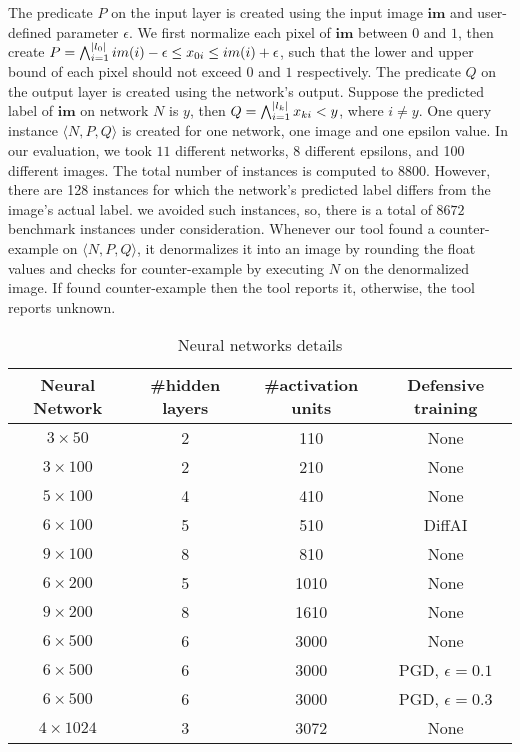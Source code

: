 The predicate $P$ on the input layer is created using the input image $\boldsymbol{im}$ and user-defined parameter $\epsilon$. 
We first normalize each pixel of $\boldsymbol{im}$ between $0$ and $1$, then create 
$P = \bigwedge_{i=1}^{|l_0|} im(i)-\epsilon \leq x_{0i}\leq im(i)+\epsilon$, such that the lower and upper bound of each pixel
should not exceed $0$ and $1$ respectively. The predicate $Q$ on the output layer is created using the network's output.    
Suppose the predicted label of $\boldsymbol{im}$ on network $N$ is $y$, then $Q = \bigwedge_{i=1}^{|l_k|} x_{ki} < y$, where $i \neq y$. 
One query instance $\langle N,P,Q \rangle$ is created for one network, one image and one epsilon value. 
In our evaluation, we took $11$ different networks, 8 different epsilons, and 100 different images. The 
total number of instances is computed to $8800$. However, there are 128 instances for which the network's predicted
label differs from the image's actual label. we avoided such instances, so, there is a total of $8672$ benchmark instances
under consideration.   
Whenever our tool found a counter-example on $\langle N,P,Q \rangle$,
it denormalizes it into an image by rounding the float values 
and checks for counter-example by executing $N$ on the denormalized image.
If found counter-example then the tool reports it, otherwise, the tool reports unknown.



\begin{table}
    \centering
    \begin{tabular}{c|c|c|c}
        \hline
        \textbf{Neural Network} & \textbf{\#hidden layers} & \textbf{\#activation units} & \textbf{Defensive training} \\
        \hline
        $3\times 50$ & 2 & 110 & None \\
        $3\times 100$ & 2 & 210 & None  \\
        $5\times 100$ & 4 & 410 & None  \\
        $6\times 100$ & 5 & 510 & DiffAI \\
        $9\times 100$ & 8 & 810 & None  \\
        $6\times 200$ & 5 & 1010 & None  \\
        $9\times 200$ & 8 & 1610 & None  \\
        $6\times 500$ & 6 & 3000 & None  \\
        $6\times 500$ & 6 & 3000 & PGD, $\epsilon = 0.1$ \\
        $6\times 500$ & 6 & 3000 & PGD, $\epsilon = 0.3$ \\
        $4\times 1024$ & 3 & 3072 & None  \\
        \hline
    \end{tabular}
    \caption{Neural networks details}
    \label{tb:nndetail}
\end{table}

